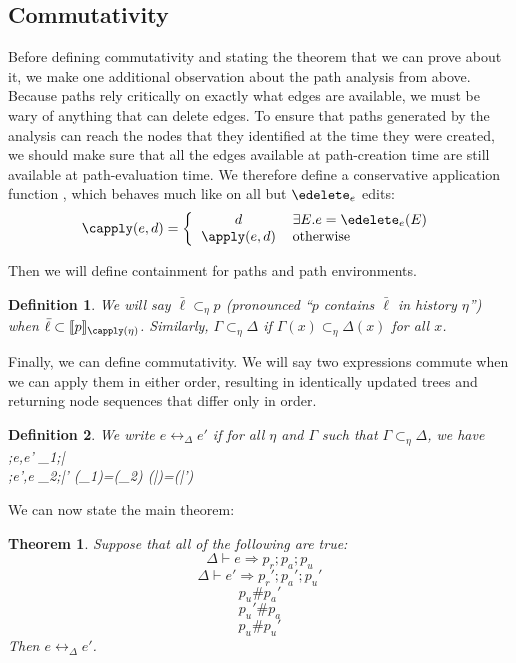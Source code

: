 \documentclass{article}
\newtheorem{definition}{Definition}
\newtheorem{theorem}{Theorem}
\newcommand{\bracket}[1]{\llbracket#1\rrbracket}
\begin{document}
\subsection{Commutativity}
Before defining commutativity and stating the theorem that we can prove
about it, we make one additional observation about the path analysis from
above. Because paths rely critically on exactly what edges are available,
we must be wary of anything that can delete edges. To ensure that paths
generated by the analysis can reach the nodes that they identified at the
time they were created, we should make sure that all the edges available at
path-creation time are still available at path-evaluation time. We therefore
define a conservative application function \capply, which behaves much like
\apply on all but $\edelete_e$ edits:
\[\capply(e,d) = \left\{\begin{tabular}{cl}
    $d$ & $\exists E. e = \edelete_e(E)$ \\
    $\apply(e,d)$ & otherwise
\end{tabular}\right.\]

Then we will define containment for paths and path environments.
\begin{definition}
    We will say $\bar\ell \subset_\eta p$ (pronounced ``$p$ contains
    $\bar\ell$ in history $\eta$'') when $\bar\ell \subset \bracket
    p_{\capply(\eta)}$.  Similarly, $\Gamma\subset_\eta\Delta$ if
    $\Gamma(x)\subset_\eta\Delta(x)$ for all $x$.
\end{definition}

Finally, we can define commutativity. We will say two expressions commute
when we can apply them in either order, resulting in identically updated
trees and returning node sequences that differ only in order.
\begin{definition}
    We write $e \leftrightarrow_\Delta e'$ if for all $\eta$ and $\Gamma$
    such that $\Gamma\subset_\eta\Delta$, we have
    \infrule
    {\Gamma \vdash \eta;e,e' \Rightarrow \eta_1;\bar\ell \\
     \Gamma \vdash \eta;e',e \Rightarrow \eta_2;\bar\ell'}
    {\capply(\eta_1)=\capply(\eta_2) \land
     (\bar\ell)=(\bar\ell')}
\end{definition}

We can now state the main theorem:
\begin{theorem}
    Suppose that all of the following are true:
    \[\Delta \vdash e \Rightarrow p_r;p_a;p_u\]
    \[\Delta \vdash e' \Rightarrow p_r';p_a';p_u'\]
    \[p_u\#p_a'\]
    \[p_u'\#p_a\]
    \[p_u\#p_u'\]
    Then $e \leftrightarrow_\Delta e'$.
\end{theorem}
\end{document}
